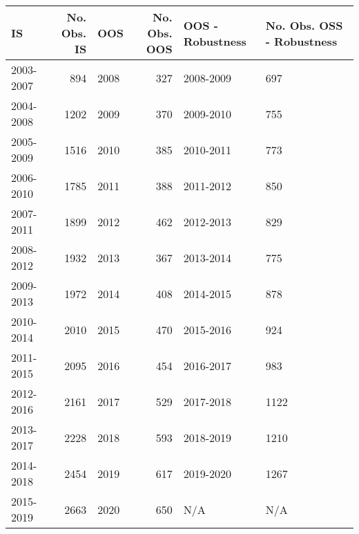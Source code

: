 \begin{tabular}{lrlrll}
\toprule
        IS &  No. Obs. IS &   OOS &  No. Obs. OOS & OOS - Robustness & No. Obs. OSS - Robustness \\
\midrule
 2003-2007 &          894 &  2008 &           327 &        2008-2009 &                       697 \\
 2004-2008 &         1202 &  2009 &           370 &        2009-2010 &                       755 \\
 2005-2009 &         1516 &  2010 &           385 &        2010-2011 &                       773 \\
 2006-2010 &         1785 &  2011 &           388 &        2011-2012 &                       850 \\
 2007-2011 &         1899 &  2012 &           462 &        2012-2013 &                       829 \\
 2008-2012 &         1932 &  2013 &           367 &        2013-2014 &                       775 \\
 2009-2013 &         1972 &  2014 &           408 &        2014-2015 &                       878 \\
 2010-2014 &         2010 &  2015 &           470 &        2015-2016 &                       924 \\
 2011-2015 &         2095 &  2016 &           454 &        2016-2017 &                       983 \\
 2012-2016 &         2161 &  2017 &           529 &        2017-2018 &                      1122 \\
 2013-2017 &         2228 &  2018 &           593 &        2018-2019 &                      1210 \\
 2014-2018 &         2454 &  2019 &           617 &        2019-2020 &                      1267 \\
 2015-2019 &         2663 &  2020 &           650 &              N/A &                       N/A \\
\bottomrule
\end{tabular}
